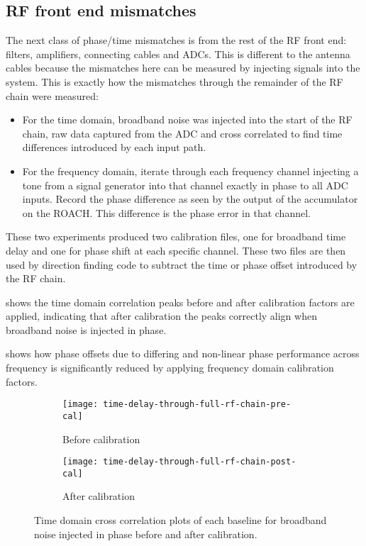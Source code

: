 \subsection{RF front end mismatches}
The next class of phase/time mismatches is from the rest of the RF front end: filters, amplifiers, connecting cables and ADCs. This is different to the antenna cables because the mismatches here can be measured by injecting signals into the system. This is exactly how the mismatches through the remainder of the RF chain were measured:
\begin{itemize}
  \item For the time domain, broadband noise was injected into the start of the RF chain, raw data captured from the ADC and cross correlated to find time differences introduced by each input path.
  \item For the frequency domain, iterate through each frequency channel injecting a tone from a signal generator into that channel exactly in phase to all ADC inputs. Record the phase difference as seen by the output of the accumulator on the ROACH. This difference is the phase error in that channel.
\end{itemize}

These two experiments produced two calibration files, one for broadband time delay and one for phase shift at each specific channel. These two files are then used by direction finding code to subtract the time or phase offset introduced by the RF chain.

 shows the time domain correlation peaks before and after calibration factors are applied, indicating that after calibration the peaks correctly align when broadband noise is injected in phase.

 shows how phase offsets due to differing and non-linear phase performance across frequency is significantly reduced by applying frequency domain calibration factors.

\begin{figure}
  \centering
  \begin{subfigure}[b]{0.49\textwidth}
    \centering
    \texttt{[image: time-delay-through-full-rf-chain-pre-cal]}
    \caption{Before calibration}
  \end{subfigure}
  \begin{subfigure}[b]{0.49\textwidth}
    \centering
    \texttt{[image: time-delay-through-full-rf-chain-post-cal]}
    \caption{After calibration}
  \end{subfigure}
  \caption{Time domain cross correlation plots of each baseline for broadband noise injected in phase before and after calibration.}
  \label{fig:software:time-domain-cal-graphs}
\end{figure}

